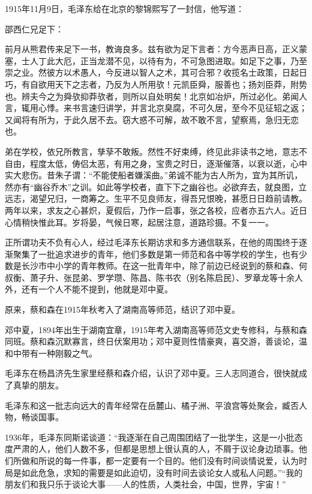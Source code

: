 \documentclass[../../dazhuan.tex]{subfiles}
\begin{document}
1915年11月9日，毛泽东给在北京的黎锦熙写了一封信，他写道：
\begin{xquote}

邵西仁兄足下： 

前月从熊君传来足下一书，教诲良多。兹有欲为足下言者：方今恶声日高，正义蒙塞，士人丁此大厄，正当龙潜不见，以待有为，不可急图进取。如足下之事，乃至崇之业。然彼方以术愚人，今反进以智人之术，其可合邪？收揽名士政策，日起日巧，有自欲用天下之志者，乃反为人所用欤！元凯臣舜，服善也；扬刘臣莽，附势也。辨夫今之为舜欤抑莽欤者，则所以自处明矣！北京如冶炉，所过必化。弟闻人言，辄用心悸。来书言速归讲学，并言北京臭腐，不可久居，至今不见征轺之返；又闻将有所为，于此久居不去。窃大惑不可解，故不敢不言，望察焉，急归无恋也。

弟在学校，依兄所教言，孳孶不敢叛。然性不好束缚，终见此非读书之地，意志不自由，程度太低，俦侣太恶，有用之身，宝贵之时日，逐渐催落，以衰以逝，心中实大悲伤。昔朱子谓：“不能使船者嫌溪曲。”弟诚不能为古人所为，宜为其所讥，然亦有“幽谷乔木”之训。如此等学校者，直下下之幽谷也。必欲弃去，就良图，立远志，渴望兄归，一商筹之。生平不见良师友，得吾兄恨晚，甚愿日日趋前请教。两年以来，求友之心甚炽，夏假后，乃作一启事，张之各校，应者亦五六人。近日心情稍快惟此耳。岁将晏，气候日寒，起居注意，道路珍摄。不复一一。


\end{xquote}

正所谓功夫不负有心人，经过毛泽东长期访求和多方通信联系，在他的周围终于逐渐聚集了一批追求进步的青年，他们多数是第一师范和各中等学校的学生，也有少数是长沙市中小学的青年教师。在这一批青年中，除了前边已经说到的蔡和森、何叔衡、萧子升、张昆弟、罗学瓒、陈昌、陈书农（别名陈启民）、罗章龙等十余人外，还有一个人不能不提到，他就是邓中夏。

原来，蔡和森在1915年秋考入了湖南高等师范，结识了邓中夏。

邓中夏，1894年出生于湖南宜章，1915年考入湖南高等师范文史专修科，与蔡和森同班。蔡和森沉默寡言，终日伏案用功；邓中夏则性情豪爽，喜交游，善谈论，温和中带有一种刚毅之气。

毛泽东在杨昌济先生家里经蔡和森介绍，认识了邓中夏。三人志同道合，很快就成了真挚的朋友。

毛泽东和这一批志向远大的青年经常在岳麓山、橘子洲、平浪宫等处聚会，臧否人物，畅谈国事。

1936年，毛泽东同斯诺谈道：“我逐渐在自己周围团结了一批学生，这是一小批态度严肃的人，他们人数不多，但都是思想上很认真的人，不屑于议论身边琐事。他们所做和所说的每一件事，都一定要有一个目的。他们没有时间谈情说爱，认为时局是如此危急，求知的需要是如此迫切，没有时间去谈论女人或私人问题。”“我的朋友们和我只乐于谈论大事——人的性质，人类社会，中国，世界，宇宙！”
\end{document}
